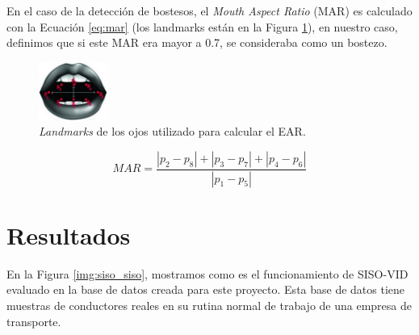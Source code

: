 \documentclass{article}
\begin{document}
	En el caso de la detección de bostesos, el \textit{Mouth Aspect Ratio} (MAR) es calculado con la Ecuación \ref{eq:mar} (los landmarks están en la Figura \ref{fig:mar}), en nuestro caso, definimos que si este MAR era mayor a 0.7, se consideraba como un bostezo.
	
	\begin{figure}[H]
		\centering
		\includegraphics[width=0.2\textwidth]{img/mar}		
		\caption{\textit{Landmarks} de los ojos utilizado para calcular el EAR.}
		\label{fig:mar}	
	\end{figure}	
	\begin{equation}\label{eq:mar}
	MAR = \frac{| p_2 - p_8| + | p_3 - p_7 | + | p_4 - p_6 |}{ | p_1 - p_5 | } 
	\end{equation}

	\section{Resultados}
	
	En la Figura \ref{img:siso_siso}, mostramos como es el funcionamiento de SISO-VID evaluado en la base de datos creada para este proyecto. Esta base de datos tiene muestras de conductores reales en su rutina normal de trabajo de una empresa de transporte.\\
	
\end{document}
